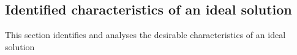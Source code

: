 \subsection{Identified characteristics of an ideal solution}
This section identifies and analyses the desirable characteristics of an ideal solution
